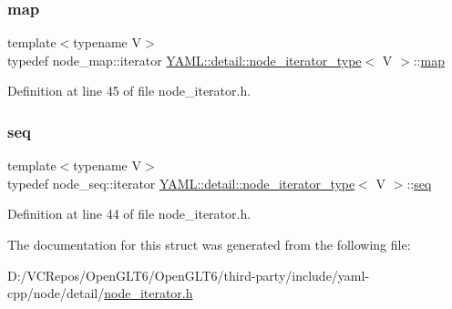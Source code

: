 \subsubsection{\texorpdfstring{map}{map}}
{\footnotesize\ttfamily template$<$typename V$>$ \\
typedef node\+\_\+map\+::iterator \mbox{\hyperlink{struct_y_a_m_l_1_1detail_1_1node__iterator__type}{Y\+A\+M\+L\+::detail\+::node\+\_\+iterator\+\_\+type}}$<$ V $>$\+::\mbox{\hyperlink{struct_y_a_m_l_1_1detail_1_1node__iterator__type_a4c095a4c94bb4ad28550077bfe8a9e76}{map}}}



Definition at line 45 of file node\+\_\+iterator.\+h.

\mbox{\label{struct_y_a_m_l_1_1detail_1_1node__iterator__type_adcd831b5b83d2cd845630e44ca6a1e5b}} 
\subsubsection{\texorpdfstring{seq}{seq}}
{\footnotesize\ttfamily template$<$typename V$>$ \\
typedef node\+\_\+seq\+::iterator \mbox{\hyperlink{struct_y_a_m_l_1_1detail_1_1node__iterator__type}{Y\+A\+M\+L\+::detail\+::node\+\_\+iterator\+\_\+type}}$<$ V $>$\+::\mbox{\hyperlink{struct_y_a_m_l_1_1detail_1_1node__iterator__type_adcd831b5b83d2cd845630e44ca6a1e5b}{seq}}}



Definition at line 44 of file node\+\_\+iterator.\+h.



The documentation for this struct was generated from the following file\+:\begin{DoxyCompactItemize}
\item 
D\+:/\+V\+C\+Repos/\+Open\+G\+L\+T6/\+Open\+G\+L\+T6/third-\/party/include/yaml-\/cpp/node/detail/\mbox{\hyperlink{node__iterator_8h}{node\+\_\+iterator.\+h}}\end{DoxyCompactItemize}
